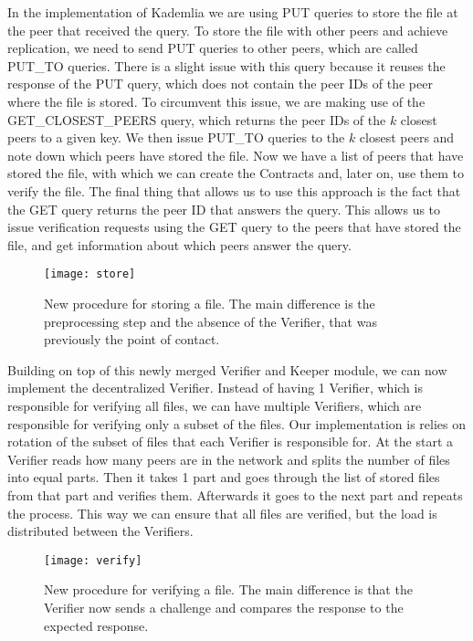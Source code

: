 In the implementation of Kademlia we are using PUT queries to store the file at the peer that received the query.
To store the file with other peers and achieve replication, we need to send PUT queries to other peers, which are called PUT\_TO queries.
There is a slight issue with this query because it reuses the response of the PUT query, which does not contain the peer IDs of the peer where the file is stored.
To circumvent this issue, we are making use of the GET\_CLOSEST\_PEERS query, which returns the peer IDs of the $k$ closest peers to a given key.
We then issue PUT\_TO queries to the $k$ closest peers and note down which peers have stored the file.
Now we have a list of peers that have stored the file, with which we can create the Contracts and, later on, use them to verify the file.
The final thing that allows us to use this approach is the fact that the GET query returns the peer ID that answers the query.
This allows us to issue verification requests using the GET query to the peers that have stored the file, and get information about which peers answer the query.

\begin{figure}[!htb]
    \centering
    \texttt{[image: store]}
    \caption{New procedure for storing a file. The main difference is the preprocessing step and the absence of the Verifier, that was previously the point of contact.}
\end{figure}

Building on top of this newly merged Verifier and Keeper module, we can now implement the decentralized Verifier.
Instead of having 1 Verifier, which is responsible for verifying all files,
we can have multiple Verifiers, which are responsible for verifying only a subset of the files.
Our implementation is relies on rotation of the subset of files that each Verifier is responsible for.
At the start a Verifier reads how many peers are in the network and splits the number of files into equal parts.
Then it takes 1 part and goes through the list of stored files from that part and verifies them.
Afterwards it goes to the next part and repeats the process.
This way we can ensure that all files are verified, but the load is distributed between the Verifiers.

\begin{figure}[!htb]
    \centering
    \texttt{[image: verify]}
    \caption{New procedure for verifying a file. The main difference is that the Verifier now sends a challenge and compares the response to the expected response.}
\end{figure}

